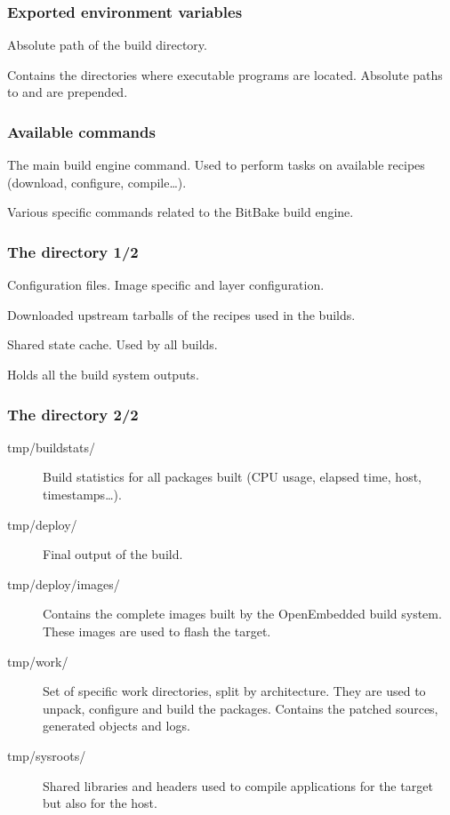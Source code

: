 \begin{frame}
  \frametitle{Exported environment variables}
  \begin{description}[style=nextline]
    \item[BUILDDIR] Absolute path of the build directory.
    \item[PATH] Contains the directories where executable programs are
      located. Absolute paths to  and
       are prepended.
  \end{description}
\end{frame}

\begin{frame}
  \frametitle{Available commands}
  \begin{description}[style=nextline]
    \item[bitbake] The main build engine command. Used to perform
      tasks on available recipes (download, configure, compile\dots).
    \item[bitbake-*] Various specific commands related to the BitBake
      build engine.
  \end{description}
\end{frame}

\begin{frame}
  \frametitle{The  directory 1/2}
  \begin{description}[style=nextline]
    \item[conf/] Configuration files. Image specific and layer
      configuration.
    \item[downloads/] Downloaded upstream tarballs of the recipes
      used in the builds.
    \item[sstate-cache/] Shared state cache. Used by all builds.
    \item[tmp/] Holds all the build system outputs.
  \end{description}
\end{frame}

\begin{frame}
  \frametitle{The  directory 2/2}
  \begin{description}
    \item[tmp/buildstats/] Build statistics for all packages built
      (CPU usage, elapsed time, host, timestamps\dots).
    \item[tmp/deploy/] Final output of the build.
    \item[tmp/deploy/images/] Contains the complete images built by
      the OpenEmbedded build system. These images are used to flash
      the target.
    \item[tmp/work/] Set of specific work directories, split by
      architecture. They are used to unpack, configure and build the
      packages. Contains the patched sources, generated objects and
      logs.
    \item[tmp/sysroots/] Shared libraries and headers used to compile
      applications for the target but also for the host.
  \end{description}
\end{frame}

